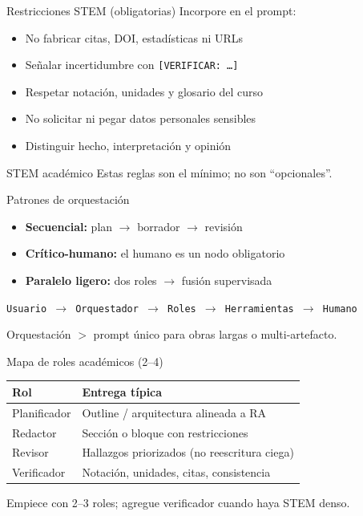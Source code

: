 \documentclass[aspectratio=169,11pt]{beamer}
\begin{document}
\begin{frame}{Restricciones STEM (obligatorias)}
Incorpore en el prompt:
\begin{itemize}
\item No fabricar citas, DOI, estadísticas ni URLs
\item Señalar incertidumbre con \texttt{[VERIFICAR: \ldots]}
\item Respetar notación, unidades y glosario del curso
\item No solicitar ni pegar datos personales sensibles
\item Distinguir hecho, interpretación y opinión
\end{itemize}
\begin{alertblock}{STEM académico}
Estas reglas son el mínimo; no son ``opcionales''.
\end{alertblock}
\end{frame}

\begin{frame}{Patrones de orquestación}
\begin{itemize}
\item \textbf{Secuencial:} plan $\rightarrow$ borrador $\rightarrow$ revisión
\item \textbf{Crítico-humano:} el humano es un nodo obligatorio
\item \textbf{Paralelo ligero:} dos roles $\rightarrow$ fusión supervisada
\end{itemize}
\begin{center}
\texttt{Usuario $\rightarrow$ Orquestador $\rightarrow$ Roles $\rightarrow$ Herramientas $\rightarrow$ Humano}
\end{center}
Orquestación $>$ prompt único para obras largas o multi-artefacto.
\end{frame}

\begin{frame}{Mapa de roles académicos (2--4)}
\begin{tabularx}{\textwidth}{@{}lX@{}}
\toprule
Rol & Entrega típica \\
\midrule
Planificador & Outline / arquitectura alineada a RA \\
Redactor & Sección o bloque con restricciones \\
Revisor & Hallazgos priorizados (no reescritura ciega) \\
Verificador & Notación, unidades, citas, consistencia \\
\bottomrule
\end{tabularx}
\vspace{0.8em}
Empiece con 2--3 roles; agregue verificador cuando haya STEM denso.
\end{frame}
\end{document}
